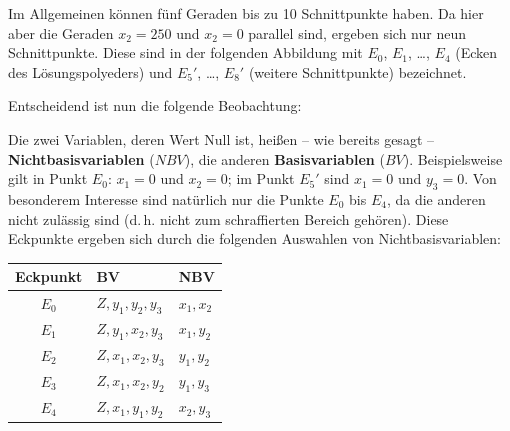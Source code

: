 Im Allgemeinen können fünf Geraden bis zu 10 Schnittpunkte haben. Da hier aber die Geraden $x_2 = 250$ und $x_2 = 0$ parallel sind, ergeben sich nur neun Schnittpunkte. Diese sind in der folgenden Abbildung mit $E_0$, $E_1$, \ldots, $E_4$ (Ecken des Lösungspolyeders) und $E_5'$, \ldots, $E_8'$ (weitere Schnittpunkte) bezeichnet.

\begin{center}
\end{center}

Entscheidend ist nun die folgende Beobachtung:

Die zwei Variablen, deren Wert Null ist, heißen -- wie bereits gesagt -- \textbf{Nichtbasisvariablen} ($NBV$), die anderen \textbf{Basisvariablen} ($BV$). Beispielsweise gilt in Punkt $E_0$: $x_1 = 0$ und $x_2 = 0$; im Punkt $E_5'$ sind $x_1 = 0$ und $y_3 = 0$. Von besonderem Interesse sind natürlich nur die Punkte $E_0$ bis $E_4$, da die anderen nicht zulässig sind (d.\,h. nicht zum schraffierten Bereich gehören). Diese Eckpunkte ergeben sich durch die folgenden Auswahlen von Nichtbasisvariablen:

\begin{center}
  \begin{tabular}{|c|l|l|}
    \hline
    Eckpunkt & BV & NBV\\
    \hline
    $E_0$ & $Z, y_1, y_2, y_3$ & $x_1, x_2$\\
    $E_1$ & $Z, y_1, x_2, y_3$ & $x_1, y_2$\\
    $E_2$ & $Z, x_1, x_2, y_3$ & $y_1, y_2$\\
    $E_3$ & $Z, x_1, x_2, y_2$ & $y_1, y_3$\\
    $E_4$ & $Z, x_1, y_1, y_2$ & $x_2, y_3$\\
    \hline
  \end{tabular}
\end{center}

